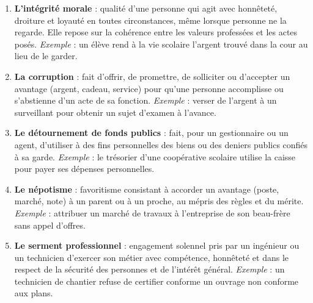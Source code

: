 \documentclass[11pt]{article}
\begin{document}
\begin{corrige}
\begin{enumerate}
\item \textbf{L'intégrité morale} : qualité d'une personne qui agit avec honnêteté, droiture et loyauté en toutes circonstances, même lorsque personne ne la regarde. Elle repose sur la cohérence entre les valeurs professées et les actes posés. \emph{Exemple} : un élève rend à la vie scolaire l'argent trouvé dans la cour au lieu de le garder.
\item \textbf{La corruption} : fait d'offrir, de promettre, de solliciter ou d'accepter un avantage (argent, cadeau, service) pour qu'une personne accomplisse ou s'abstienne d'un acte de sa fonction. \emph{Exemple} : verser de l'argent à un surveillant pour obtenir un sujet d'examen à l'avance.
\item \textbf{Le détournement de fonds publics} : fait, pour un gestionnaire ou un agent, d'utiliser à des fins personnelles des biens ou des deniers publics confiés à sa garde. \emph{Exemple} : le trésorier d'une coopérative scolaire utilise la caisse pour payer ses dépenses personnelles.
\item \textbf{Le népotisme} : favoritisme consistant à accorder un avantage (poste, marché, note) à un parent ou à un proche, au mépris des règles et du mérite. \emph{Exemple} : attribuer un marché de travaux à l'entreprise de son beau-frère sans appel d'offres.
\item \textbf{Le serment professionnel} : engagement solennel pris par un ingénieur ou un technicien d'exercer son métier avec compétence, honnêteté et dans le respect de la sécurité des personnes et de l'intérêt général. \emph{Exemple} : un technicien de chantier refuse de certifier conforme un ouvrage non conforme aux plans.
\end{enumerate}
\end{corrige}
\end{document}
